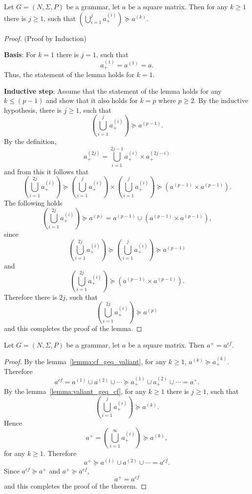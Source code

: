 \begin{lemma}\label{lemma:valiant_geq_cf}
	Let $G =(N,\Sigma,P)$ be a grammar, let $a$ be a square matrix. Then for any $k \geq 1$ there is $j \geq 1$, such that $(\bigcup^{j}_{i=1}{a^{(i)}_+}) \succeq a^{(k)}$.
\end{lemma}
\begin{proof}(Proof by Induction)
	
	\textbf{Basis}: For $k = 1$ there is $j = 1$, such that $$a^{(1)}_+ = a^{(1)} = a.$$ Thus, the statement of the lemma holds for $k = 1$.
	
	\textbf{Inductive step}: Assume that the statement of the lemma holds for any $k \leq (p - 1)$ and show that it also holds for $k = p$ where $p \geq 2$. By the inductive hypothesis, there is $j \geq 1$, such that $$(\bigcup^{j}_{i=1}{a^{(i)}_+}) \succeq a^{(p-1)}.$$ By the definition, $$a^{(2j)}_+ = \bigcup^{2j-1}_{i=1}{a^{(i)}_+ \times a^{(2j-i)}_+}$$ and from this it follows that $$(\bigcup^{2j}_{i=1}{a^{(i)}_+}) \succeq (\bigcup^{j}_{i=1}{a^{(i)}_+}) \times (\bigcup^{j}_{i=1}{a^{(i)}_+}) \succeq (a^{(p-1)} \times a^{(p-1)}).$$ The following holds $$(\bigcup^{2j}_{i=1}{a^{(i)}_+}) \succeq a^{(p)} = a^{(p-1)} \cup (a^{(p-1)} \times a^{(p-1)}),$$ since $$(\bigcup^{2j}_{i=1}{a^{(i)}_+}) \succeq (\bigcup^{j}_{i=1}{a^{(i)}_+}) \succeq a^{(p-1)}$$ and $$(\bigcup^{2j}_{i=1}{a^{(i)}_+}) \succeq (a^{(p-1)} \times a^{(p-1)}).$$ Therefore there is $2j$, such that $$(\bigcup^{2j}_{i=1}{a^{(i)}_+}) \succeq a^{(p)}$$ and this completes the proof of the lemma.	
\end{proof}

\begin{mytheorem}\label{thm:closures}
	Let $G =(N,\Sigma,P)$ be a grammar, let $a$ be a square matrix. Then $a^+ = a^{cf}$.
\end{mytheorem}
\begin{proof}
	
	By the lemma~\ref{lemma:cf_geq_valiant}, for any $k \geq 1$, $a^{(k)} \succeq a^{(k)}_+$. Therefore $$a^{cf} = a^{(1)} \cup a^{(2)} \cup \cdots \succeq a^{(1)}_+ \cup a^{(2)}_+ \cup \cdots = a^+.$$ By the lemma~\ref{lemma:valiant_geq_cf}, for any $k \geq 1$ there is $j \geq 1$, such that $$(\bigcup^{j}_{i=1}{a^{(i)}_+}) \succeq a^{(k)}.$$ Hence $$a^+ = (\bigcup^{\infty}_{i=1}{a^{(i)}_+}) \succeq a^{(k)},$$ for any $k \geq 1$. Therefore $$a^+ \succeq a^{(1)} \cup a^{(2)} \cup \cdots = a^{cf}.$$ Since $a^{cf} \succeq a^+$ and $a^+ \succeq a^{cf}$, $$a^+ = a^{cf}$$ and this completes the proof of the theorem.
\end{proof}

